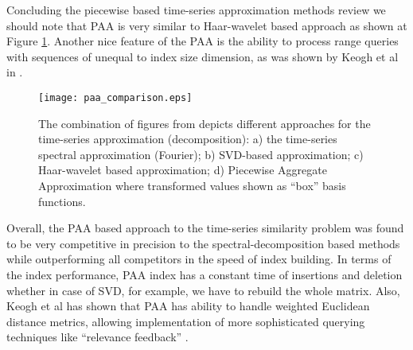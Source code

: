 Concluding the piecewise based time-series approximation methods review we should note that PAA is very similar to Haar-wavelet based approach \cite{citeulike:4384535} as shown at Figure \ref{fig:paa_comparison}. Another nice feature of the PAA is the ability to process range queries with sequences of unequal to index size dimension, as was shown by Keogh et al in \cite{citeulike:3000416}.
\begin{figure}[tbp]
   \centering
   \texttt{[image: paa\_comparison.eps]}
   \caption{The combination of figures from \cite{citeulike:3000416} depicts different approaches for the time-series approximation (decomposition): a) the time-series spectral approximation (Fourier); b) SVD-based approximation; c) Haar-wavelet based approximation; d) Piecewise Aggregate Approximation where transformed values shown as ``box'' basis functions.}
   \label{fig:paa_comparison}
\end{figure} 

Overall, the PAA based approach to the time-series similarity problem was found to be very competitive in precision to the spectral-decomposition based methods while outperforming all competitors in the speed of index building. In terms of the index performance, PAA index has a constant time of insertions and deletion whether in case of SVD, for example, we have to rebuild the whole matrix. Also, Keogh et al has shown that PAA has ability to handle weighted Euclidean distance metrics, allowing implementation of more sophisticated querying techniques like ``relevance feedback'' \cite{citeulike:4406444}.
